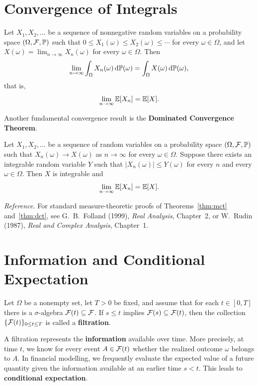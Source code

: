\section{Convergence of Integrals}
\begin{theorem}\label{thm:mct}
    Let $X_1, X_2, \ldots$ be a sequence of nonnegative random variables on a probability space $(\Omega, \mathcal{F}, \mathbb{P})$ such that $0 \leq X_1(\omega) \leq X_2(\omega) \leq \cdots$ for every $\omega \in \Omega$, and let $X(\omega) = \lim_{n \to \infty} X_n(\omega)$ for every $\omega \in \Omega$. Then
    \[
    \lim_{n \to \infty} \int_{\Omega} X_n(\omega)\,\mathrm{d}\mathbb{P}(\omega) = \int_{\Omega} X(\omega)\,\mathrm{d}\mathbb{P}(\omega),
    \]
    that is,
    \[
    \lim_{n \to \infty} \mathbb{E}[X_n] = \mathbb{E}[X].
    \]
\end{theorem}
Another fundamental convergence result is the \textbf{Dominated Convergence Theorem}.
\begin{theorem}\label{thm:dct}
    Let $X_1, X_2, \ldots$ be a sequence of random variables on a probability space $(\Omega, \mathcal{F}, \mathbb{P})$ such that $X_n(\omega) \to X(\omega)$ as $n \to \infty$ for every $\omega \in \Omega$. Suppose there exists an integrable random variable $Y$ such that $|X_n(\omega)| \leq Y(\omega)$ for every $n$ and every $\omega \in \Omega$. Then $X$ is integrable and
    \[
    \lim_{n \to \infty} \mathbb{E}[X_n] = \mathbb{E}[X].
    \]
\end{theorem}
\noindent\emph{Reference.} For standard measure-theoretic proofs of Theorems~\ref{thm:mct} and~\ref{thm:dct}, see G.~B.~Folland (1999), \emph{Real Analysis}, Chapter~2, or W.~Rudin (1987), \emph{Real and Complex Analysis}, Chapter~1.

\section{Information and Conditional Expectation}
\begin{definition}\label{def:filtration-app}
    Let $\Omega$ be a nonempty set, let $T > 0$ be fixed, and assume that for each $t \in [0, T]$ there is a $\sigma$-algebra $\mathcal{F}(t) \subseteq \mathcal{F}$. If $s \leq t$ implies $\mathcal{F}(s) \subseteq \mathcal{F}(t)$, then the collection $\{\mathcal{F}(t)\}_{0 \leq t \leq T}$ is called a \textbf{filtration}.
\end{definition}
A filtration represents the \textbf{information} available over time. More precisely, at time $t$, we know for every event $A \in \mathcal{F}(t)$ whether the realized outcome $\omega$ belongs to $A$. In financial modelling, we frequently evaluate the expected value of a future quantity given the information available at an earlier time $s < t$. This leads to \textbf{conditional expectation}.

